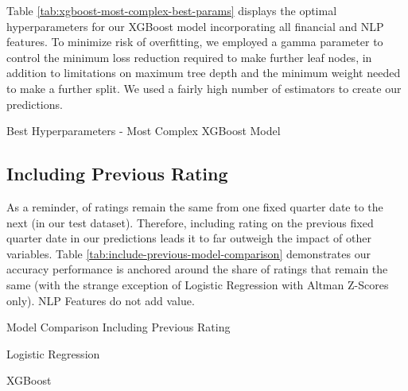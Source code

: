\documentclass{article}[11pt]
\begin{document}
    Table \ref{tab:xgboost-most-complex-best-params} displays the optimal hyperparameters for our XGBoost model incorporating all financial and NLP features. To minimize risk of overfitting, we employed a gamma parameter to control the minimum loss reduction required to make further leaf nodes, in addition to limitations on maximum tree depth and the minimum weight needed to make a further split. We used a fairly high number of estimators to create our predictions.

    \begin{table}[h!]
        \centering
        \caption{Best Hyperparameters - Most Complex XGBoost Model}
        
        \label{tab:xgboost-most-complex-best-params}
    \end{table}

    \clearpage
    \newpage

    \subsection{Including Previous Rating}

    \label{sec:include-previous-rating}

    As a reminder, \shareNotChanges \space of ratings remain the same from one fixed quarter date to the next (\shareNotChangesTest \space in our test dataset). Therefore, including rating on the previous fixed quarter date in our predictions leads it to far outweigh the impact of other variables. Table \ref{tab:include-previous-model-comparison} demonstrates our accuracy performance is anchored around the share of ratings that remain the same (with the strange exception of Logistic Regression with Altman Z-Scores only). NLP Features do not add value.

    \begin{table}[h!]
        \centering
        \caption{Model Comparison Including Previous Rating}
        \begin{minipage}[c]{0.495\linewidth}
            \centering
            
            \caption*{\footnotesize Logistic Regression} 
        \end{minipage}
        \begin{minipage}[c]{0.495\linewidth}
            \centering
            
            \caption*{\footnotesize XGBoost} 
        \end{minipage}
        \label{tab:include-previous-model-comparison}
    \end{table}
\end{document}
